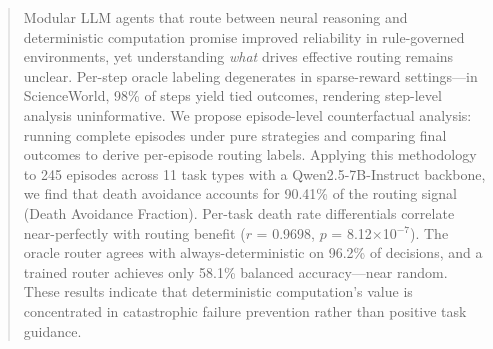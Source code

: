 \begin{abstract}
Modular LLM agents that route between neural reasoning and deterministic computation promise improved reliability in rule-governed environments, yet understanding \emph{what} drives effective routing remains unclear. Per-step oracle labeling degenerates in sparse-reward settings---in ScienceWorld, 98\% of steps yield tied outcomes, rendering step-level analysis uninformative. We propose episode-level counterfactual analysis: running complete episodes under pure strategies and comparing final outcomes to derive per-episode routing labels. Applying this methodology to 245 episodes across 11 task types with a Qwen2.5-7B-Instruct backbone, we find that death avoidance accounts for 90.41\% of the routing signal (Death Avoidance Fraction). Per-task death rate differentials correlate near-perfectly with routing benefit ($r$ = 0.9698, $p$ = 8.12$\times$10$^{-7}$). The oracle router agrees with always-deterministic on 96.2\% of decisions, and a trained router achieves only 58.1\% balanced accuracy---near random. These results indicate that deterministic computation's value is concentrated in catastrophic failure prevention rather than positive task guidance.
\end{abstract}

